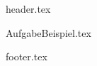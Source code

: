 \documentclass[a4paper,12pt]{article}
\begin{document}
{header.tex}

{AufgabeBeispiel.tex}

{footer.tex}
\end{document}
